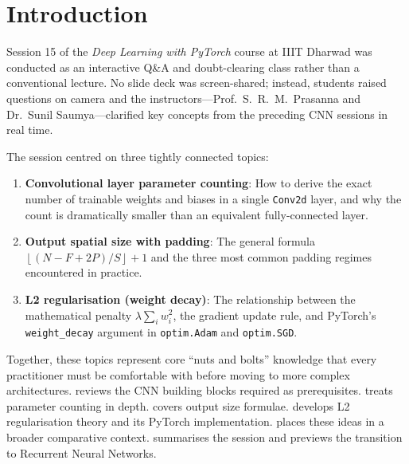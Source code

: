 \documentclass[12pt,a4paper]{article}
\newcommand{\floor}[1]{\left\lfloor #1 \right\rfloor}
\begin{document}
\newpage

\section{Introduction}
\label{sec:intro}

Session 15 of the \emph{Deep Learning with PyTorch} course at IIIT Dharwad
was conducted as an interactive Q\&A and doubt-clearing class rather than a
conventional lecture. No slide deck was screen-shared; instead, students
raised questions on camera and the instructors---Prof.\ S.~R.~M.\ Prasanna
and Dr.\ Sunil Saumya---clarified key concepts from the preceding CNN
sessions in real time.

The session centred on three tightly connected topics:

\begin{enumerate}[label=\textbf{(\arabic*)}]
  \item \textbf{Convolutional layer parameter counting}: How to derive the
        exact number of trainable weights and biases in a single
        \texttt{Conv2d} layer, and why the count is dramatically smaller
        than an equivalent fully-connected layer.
  \item \textbf{Output spatial size with padding}: The general formula
        $\floor{(N - F + 2P)/S} + 1$ and the three most common padding
        regimes encountered in practice.
  \item \textbf{L2 regularisation (weight decay)}: The relationship between
        the mathematical penalty $\lambda \sum_i w_i^2$, the gradient update
        rule, and PyTorch's \texttt{weight\_decay} argument in
        \texttt{optim.Adam} and \texttt{optim.SGD}.
\end{enumerate}

Together, these topics represent core ``nuts and bolts'' knowledge that
every practitioner must be comfortable with before moving to more complex
architectures.  reviews the CNN building blocks
required as prerequisites.  treats parameter counting
in depth.  covers output size formulae.
 develops L2 regularisation theory and its PyTorch
implementation.  places these ideas in a broader
comparative context.  summarises the session and
previews the transition to Recurrent Neural Networks.
\end{document}
